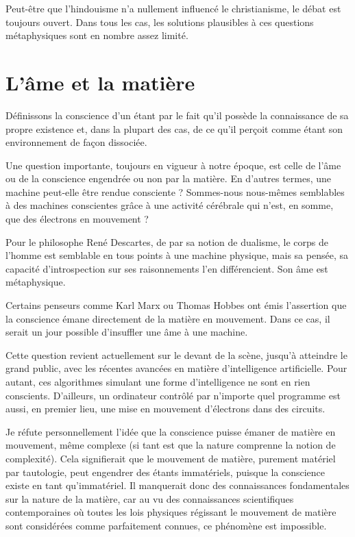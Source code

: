 Peut-être que l’hindouisme n’a nullement influencé le christianisme, le débat est toujours ouvert. Dans tous les cas, les solutions plausibles à ces questions métaphysiques sont en nombre assez limité.

\chapter{L'âme et la matière}

Définissons la conscience d'un étant par le fait qu'il possède la connaissance de sa propre existence et, dans la plupart des cas, de ce qu'il perçoit comme étant son environnement de façon dissociée.

Une question importante, toujours en vigueur à notre époque, est celle de l'âme ou de la conscience engendrée ou non par la matière. En d'autres termes, une machine peut-elle être rendue consciente ? Sommes-nous nous-mêmes semblables à des machines conscientes grâce à une activité cérébrale qui n'est, en somme, que des électrons en mouvement ?

Pour le philosophe René Descartes, de par sa notion de dualisme, le corps de l'homme est semblable en tous points à une machine physique, mais sa pensée, sa capacité d'introspection sur ses raisonnements l'en différencient. Son âme est métaphysique.

Certains penseurs comme Karl Marx ou Thomas Hobbes ont émis l'assertion que la conscience émane directement de la matière en mouvement. Dans ce cas, il serait un jour possible d’insuffler une âme à une machine.

Cette question revient actuellement sur le devant de la scène, jusqu'à atteindre le grand public, avec les récentes avancées en matière d'intelligence artificielle. Pour autant, ces algorithmes simulant une forme d’intelligence ne sont en rien conscients. D'ailleurs, un ordinateur contrôlé par n'importe quel programme est aussi, en premier lieu, une mise en mouvement d'électrons dans des circuits.

Je réfute personnellement l'idée que la conscience puisse émaner de matière en mouvement, même complexe (si tant est que la nature comprenne la notion de complexité). Cela signifierait que le mouvement de matière, purement matériel par tautologie, peut engendrer des étants immatériels, puisque la conscience existe en tant qu'immatériel. Il manquerait donc des connaissances fondamentales sur la nature de la matière, car au vu des connaissances scientifiques contemporaines où toutes les lois physiques régissant le mouvement de matière sont considérées comme parfaitement connues, ce phénomène est impossible.

